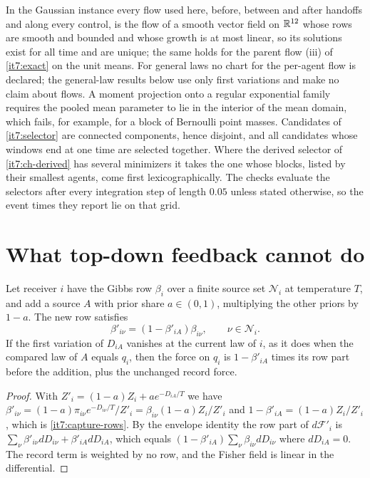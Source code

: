 \documentclass[11pt,letterpaper]{report}
\begin{document}
In the Gaussian instance every flow used here, before, between and after handoffs and along every control, is the flow of a smooth vector field on $\mathbb R^{12}$ whose rows are smooth and bounded and whose growth is at most linear, so its solutions exist for all time and are unique; the same holds for the parent flow (iii) of \cref{it7:exact} on the unit means. For general laws no chart for the per-agent flow is declared; the general-law results below use only first variations and make no claim about flows. A moment projection onto a regular exponential family requires the pooled mean parameter to lie in the interior of the mean domain, which fails, for example, for a block of Bernoulli point masses. Candidates of \cref{it7:selector} are connected components, hence disjoint, and all candidates whose windows end at one time are selected together. Where the derived selector of \cref{it7:ch-derived} has several minimizers it takes the one whose blocks, listed by their smallest agents, come first lexicographically. The checks evaluate the selectors after every integration step of length $0.05$ unless stated otherwise, so the event times they report lie on that grid.

\chapter{What top-down feedback cannot do}
\label{it7:ch-negative}

Let receiver $i$ have the Gibbs row $\beta_i$ over a finite source set $\mathcal N_i$ at temperature $T$, and add a source $A$ with prior share $a\in(0,1)$, multiplying the other priors by $1-a$. The new row satisfies
\begin{equation}
\beta'_{i\nu}=(1-\beta'_{iA})\beta_{i\nu},\qquad\nu\in\mathcal N_i.
\label{it7:capture-rows}
\end{equation}
If the first variation of $D_{iA}$ vanishes at the current law of $i$, as it does when the compared law of $A$ equals $q_i$, then the force on $q_i$ is $1-\beta'_{iA}$ times its row part before the addition, plus the unchanged record force.
\begin{proof}
With $Z'_i=(1-a)Z_i+ae^{-D_{iA}/T}$ we have $\beta'_{i\nu}=(1-a)\pi_{i\nu}e^{-D_{i\nu}/T}/Z'_i=\beta_{i\nu}(1-a)Z_i/Z'_i$ and $1-\beta'_{iA}=(1-a)Z_i/Z'_i$, which is \cref{it7:capture-rows}. By the envelope identity the row part of $d\mathcal F'_i$ is $\sum_\nu\beta'_{i\nu}dD_{i\nu}+\beta'_{iA}dD_{iA}$, which equals $(1-\beta'_{iA})\sum_\nu\beta_{i\nu}dD_{i\nu}$ where $dD_{iA}=0$. The record term is weighted by no row, and the Fisher field is linear in the differential.
\end{proof}
\end{document}
